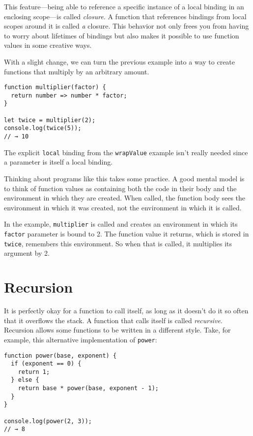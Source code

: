 This feature—being able to reference a specific instance of a local binding in an enclosing scope—is called \emph{closure}. A function that references bindings from local scopes around it is called \emph{a} closure. This behavior not only frees you from having to worry about lifetimes of bindings but also makes it possible to use function values in some creative ways.

With a slight change, we can turn the previous example into a way to create functions that multiply by an arbitrary amount.

\begin{lstlisting}
function multiplier(factor) {
  return number => number * factor;
}

let twice = multiplier(2);
console.log(twice(5));
// → 10
\end{lstlisting}
\noindent{}

The explicit \lstinline`local` binding from the \lstinline`wrapValue` example isn't really needed since a parameter is itself a local binding.

Thinking about programs like this takes some practice. A good mental model is to think of function values as containing both the code in their body and the environment in which they are created. When called, the function body sees the environment in which it was created, not the environment in which it is called.

In the example, \lstinline`multiplier` is called and creates an environment in which its \lstinline`factor` parameter is bound to 2. The function value it returns, which is stored in \lstinline`twice`, remembers this environment. So when that is called, it multiplies its argument by 2.

\section{Recursion}

It is perfectly okay for a function to call itself, as long as it doesn't do it so often that it overflows the stack. A function that calls itself is called \emph{recursive}. Recursion allows some functions to be written in a different style. Take, for example, this alternative implementation of \lstinline`power`:

\begin{lstlisting}
function power(base, exponent) {
  if (exponent == 0) {
    return 1;
  } else {
    return base * power(base, exponent - 1);
  }
}

console.log(power(2, 3));
// → 8
\end{lstlisting}
\noindent{}


